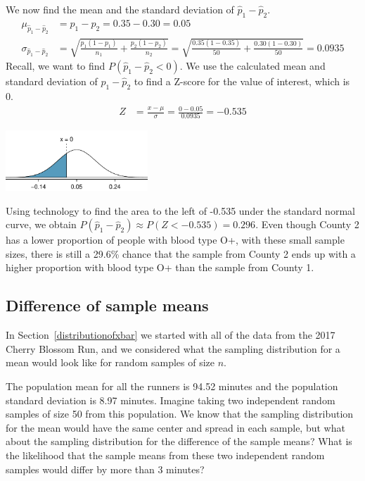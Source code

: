 \begin{examplewrap}
\begin{nexample}
We now find the mean and the standard deviation of $\hat{p}_1-\hat{p}_2$.  
\begin{align*}
\mu_{\hat{p}_1-\hat{p}_2} &= p_1-p_2 = 0.35 - 0.30 = 0.05 \\
\sigma_{\hat{p}_1-\hat{p}_2}
  &= \sqrt{\frac{p_1(1-p_1)}{n_1} + \frac{p_2(1-p_2)}{n_2}}
  =\sqrt{\frac{0.35(1-0.35)}{50} + \frac{0.30(1-0.30)}{50}}
  = 0.0935
\end{align*}
Recall, we want to find $P(\hat{p}_1-\hat{p}_2<0)$.  We use the calculated mean and standard deviation of $\hat{p}_1-\hat{p}_2$ to find a Z-score for the value of interest, which is 0.
\begin{align*}
Z &= \frac{x - \mu}{\sigma} = \frac{0 - 0.05}{0.0935}=-0.535
\end{align*}
\begin{center}
\includegraphics[width=0.4\textwidth]{ch_distributions/figures/bloodtypeOpos/bloodtypeOposMeanComparison}
\end{center}
Using technology to find the area to the left of -0.535 under the standard normal curve, we obtain $P(\hat{p}_1-\hat{p}_2) \approx P(Z < -0.535) = 0.296$.  Even though County 2 has a lower proportion of people with blood type O+, with these small sample sizes, there is still a 29.6\% chance that the sample from County 2 ends up with a higher proportion with blood type O+  than the sample from County 1.
\end{nexample}
\end{examplewrap}


\subsection{Difference of sample means}
In Section~\ref{distributionofxbar} we started with all of the data from the 2017 Cherry Blossom Run, and we considered what the sampling distribution for a mean would look like for random samples of size $n$.

The population mean for all the runners is 94.52 minutes and the population standard deviation is 8.97 minutes.
Imagine taking two independent random samples of size 50 from this population.
We know that the sampling distribution for the mean would have the same center and spread in each sample, but what about the sampling distribution for the difference of the sample means?
What is the likelihood that the sample means from these two independent random samples would differ by more than 3 minutes?

